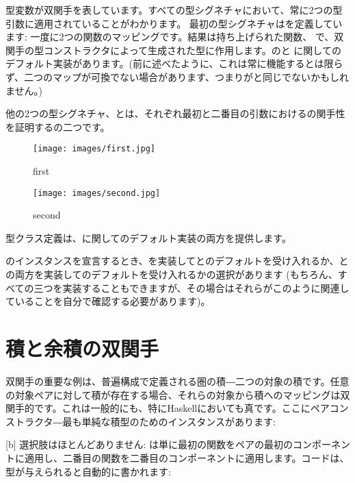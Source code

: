 型変数が双関手を表しています。すべての型シグネチャにおいて、常に2つの型引数に適用されていることがわかります。
最初の型シグネチャはを定義しています: 一度に2つの関数のマッピングです。結果は持ち上げられた関数、
で、双関手の型コンストラクタによって生成された型に作用します。のと
に関してのデフォルト実装があります。(前に述べたように、これは常に機能するとは限らず、二つのマップが可換でない場合があります、つまりがと同じでないかもしれません。) 

\noindent
他の2つの型シグネチャ、とは、それぞれ最初と二番目の引数におけるの関手性を証明するの二つです。

\begin{figure}[H]
  \centering
  \begin{minipage}{0.45\textwidth}
    \centering
    \texttt{[image: images/first.jpg]} %
    \caption{first}
  \end{minipage}\hfill
  \begin{minipage}{0.45\textwidth}
    \centering
    \texttt{[image: images/second.jpg]} %
    \caption{second}
  \end{minipage}
\end{figure}

\noindent
型クラス定義は、に関してのデフォルト実装の両方を提供します。

のインスタンスを宣言するとき、を実装してとのデフォルトを受け入れるか、との両方を実装してのデフォルトを受け入れるかの選択があります (もちろん、すべての三つを実装することもできますが、その場合はそれらがこのように関連していることを自分で確認する必要があります)。

\section{積と余積の双関手}

双関手の重要な例は、普遍構成で定義される圏の積―二つの対象の積です。任意の対象ペアに対して積が存在する場合、それらの対象から積へのマッピングは双関手的です。これは一般的にも、特にHaskellにおいても真です。ここにペアコンストラクタ―最も単純な積型のためのインスタンスがあります: 

[b]
選択肢はほとんどありません: は単に最初の関数をペアの最初のコンポーネントに適用し、二番目の関数を二番目のコンポーネントに適用します。コードは、型が与えられると自動的に書かれます: 

